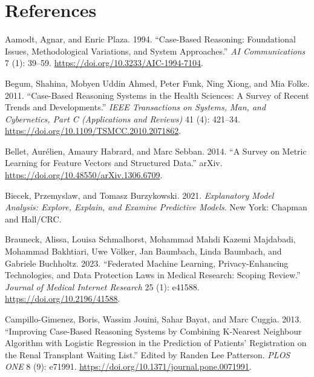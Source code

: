 \documentclass{article}
\newlength{\cslhangindent}
\newlength{\cslentryspacingunit} %
\newenvironment{CSLReferences}[2] %
 {%
  \setlength{\parindent}{0pt}
  \ifodd #1
  \let\oldpar\par
  \def\par{\hangindent=\cslhangindent\oldpar}
  \fi
  \setlength{\parskip}{#2\cslentryspacingunit}
 }%
 {}
\begin{document}
\hypertarget{references}{%
\section*{References}\label{references}}

\hypertarget{refs}{}
\begin{CSLReferences}{1}{0}
\leavevmode{}%
Aamodt, Agnar, and Enric Plaza. 1994. {``Case-{Based Reasoning}:
{Foundational Issues}, {Methodological Variations}, and {System
Approaches}.''} \emph{AI Communications} 7 (1): 39--59.
\url{https://doi.org/10.3233/AIC-1994-7104}.

\leavevmode{}%
Begum, Shahina, Mobyen Uddin Ahmed, Peter Funk, Ning Xiong, and Mia
Folke. 2011. {``Case-{Based Reasoning Systems} in the {Health Sciences}:
{A Survey} of {Recent Trends} and {Developments}.''} \emph{IEEE
Transactions on Systems, Man, and Cybernetics, Part C (Applications and
Reviews)} 41 (4): 421--34.
\url{https://doi.org/10.1109/TSMCC.2010.2071862}.

\leavevmode{}%
Bellet, Aurélien, Amaury Habrard, and Marc Sebban. 2014. {``A {Survey}
on {Metric Learning} for {Feature Vectors} and {Structured Data}.''}
arXiv. \url{https://doi.org/10.48550/arXiv.1306.6709}.

\leavevmode{}%
Biecek, Przemyslaw, and Tomasz Burzykowski. 2021. \emph{Explanatory
{Model Analysis}: {Explore}, {Explain}, and {Examine Predictive
Models}}. New York: {Chapman and Hall/CRC}.

\leavevmode{}%
Brauneck, Alissa, Louisa Schmalhorst, Mohammad Mahdi Kazemi Majdabadi,
Mohammad Bakhtiari, Uwe Völker, Jan Baumbach, Linda Baumbach, and
Gabriele Buchholtz. 2023. {``Federated {Machine Learning},
{Privacy-Enhancing Technologies}, and {Data Protection Laws} in {Medical
Research}: {Scoping Review}.''} \emph{Journal of Medical Internet
Research} 25 (1): e41588. \url{https://doi.org/10.2196/41588}.

\leavevmode{}%
Campillo-Gimenez, Boris, Wassim Jouini, Sahar Bayat, and Marc Cuggia.
2013. {``Improving {Case-Based Reasoning Systems} by {Combining
K-Nearest Neighbour Algorithm} with {Logistic Regression} in the
{Prediction} of {Patients}' {Registration} on the {Renal Transplant
Waiting List}.''} Edited by Randen Lee Patterson. \emph{PLOS ONE} 8 (9):
e71991. \url{https://doi.org/10.1371/journal.pone.0071991}.


\end{CSLReferences}
\end{document}
